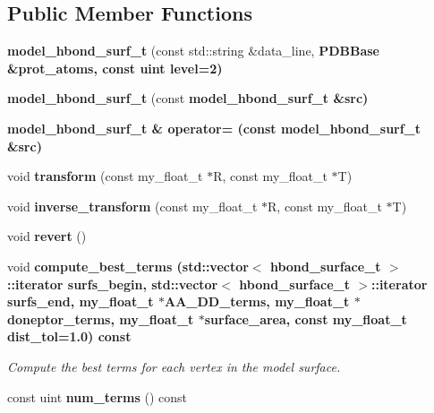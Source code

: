 \subsection*{Public Member Functions}
\begin{CompactItemize}
\item 
\textbf{model\_\-hbond\_\-surf\_\-t} (const std::string \&data\_\-line, \bf{PDBBase} \&prot\_\-atoms, const uint level=2)\label{classASCbase_1_1model__hbond__surf__t_cb646a3dbc03f4990450144a918753a8}

\item 
\textbf{model\_\-hbond\_\-surf\_\-t} (const \bf{model\_\-hbond\_\-surf\_\-t} \&src)\label{classASCbase_1_1model__hbond__surf__t_c6978b9984df3bdd11e5b492600468c2}

\item 
\bf{model\_\-hbond\_\-surf\_\-t} \& \textbf{operator=} (const \bf{model\_\-hbond\_\-surf\_\-t} \&src)\label{classASCbase_1_1model__hbond__surf__t_01930d6fccfbfb3c509b686060699606}

\item 
void \textbf{transform} (const my\_\-float\_\-t $\ast$R, const my\_\-float\_\-t $\ast$T)\label{classASCbase_1_1model__hbond__surf__t_65d5a73c0ffcbada1c8496c81a43929a}

\item 
void \textbf{inverse\_\-transform} (const my\_\-float\_\-t $\ast$R, const my\_\-float\_\-t $\ast$T)\label{classASCbase_1_1model__hbond__surf__t_b0ebe991b54fb1b3247a4a716a0673d4}

\item 
void \textbf{revert} ()\label{classASCbase_1_1model__hbond__surf__t_da904de58db5258030d9144908f915c6}

\item 
void \bf{compute\_\-best\_\-terms} (std::vector$<$ \bf{hbond\_\-surface\_\-t} $>$::iterator surfs\_\-begin, std::vector$<$ \bf{hbond\_\-surface\_\-t} $>$::iterator surfs\_\-end, my\_\-float\_\-t $\ast$AA\_\-DD\_\-terms, my\_\-float\_\-t $\ast$doneptor\_\-terms, my\_\-float\_\-t $\ast$surface\_\-area, const my\_\-float\_\-t dist\_\-tol=1.0) const 
\begin{CompactList}\small\item\em Compute the best terms for each vertex in the model surface. \item\end{CompactList}\item 
const uint \textbf{num\_\-terms} () const \label{classASCbase_1_1model__hbond__surf__t_d29013b948a3de1594b72640d8f54aa0}


\end{CompactItemize}
